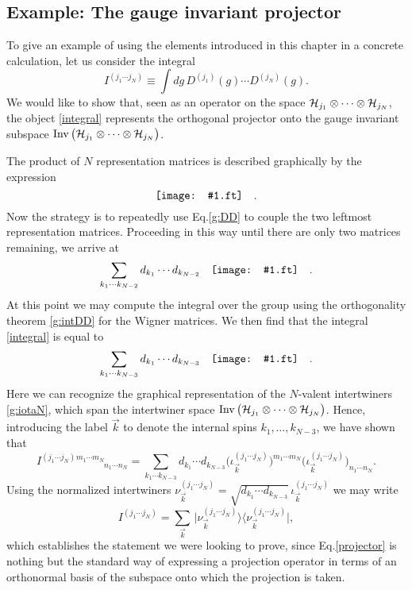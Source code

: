 \documentclass[graybox, secnum]{svmult}
\makeatletter
\newcommand{\ft}{pdf}        %
\newcommand{\makeSymbol}[1]{\mathord{\vcenter{\hbox{#1}}}}
\newcommand{\Symbol}[1]{\makeSymbol{\texttt{[image: \#1.\\ft]}}}
\newcommand{\bbra}[1]{\bigl\langle #1 \bigr|}
\newcommand{\bket}[1]{\bigl|#1\bigr\rangle}
\newcommand{\Eq}[1]{Eq.\@\xspace\eqref{#1}}
\newcommand{\updown}[2]{^{#1}_{\phantom{#1}#2}}
\makeatother
\begin{document}
\subsection{Example: The gauge invariant projector}

To give an example of using the elements introduced in this chapter in a concrete calculation, let us consider the integral
\begin{equation}
	I^{(j_1\cdots j_N)} \equiv \int dg\,D^{(j_1)}(g)\cdots D^{(j_N)}(g).
	\label{integral}
\end{equation}
We would like to show that, seen as an operator on the space ${\cal H}_{j_1} \otimes \cdots \otimes {\cal H}_{j_N}$, the object \eqref{integral} represents the orthogonal projector onto the gauge invariant subspace ${\rm Inv}\,\bigl({\cal H}_{j_1} \otimes \cdots \otimes {\cal H}_{j_N}\bigr)$.

The product of $N$ representation matrices is described graphically by the expression
\begin{equation}
	\Symbol{D_product} \quad . 
	\label{}
\end{equation}
Now the strategy is to repeatedly use \Eq{g:DD} to couple the two leftmost representation matrices. Proceeding in this way until there are only two matrices remaining, we arrive at
\begin{equation}
	\sum_{k_1\cdots k_{N-2}} d_{k_1}\cdots d_{k_{N-2}}\quad\Symbol{all_coupled} \quad . 
	\label{}
\end{equation}
At this point we may compute the integral over the group using the orthogonality theorem \eqref{g:intDD} for the Wigner matrices. We then find that the integral \eqref{integral} is equal to
\begin{equation}
	\sum_{k_1\cdots k_{N-3}} d_{k_1}\cdots d_{k_{N-3}}\quad \Symbol{projector} \quad . 
	\label{}
\end{equation}
Here we can recognize the graphical representation of the $N$-valent intertwiners \eqref{g:iotaN}, which span the intertwiner space ${\rm Inv}\,\bigl({\cal H}_{j_1} \otimes \cdots \otimes {\cal H}_{j_N}\bigr)$. Hence, introducing the label $\vec k$ to denote the internal spins $k_1, \dots, k_{N-3}$, we have shown that
\begin{equation}
	I^{(j_1\cdots j_N)}{}\updown{m_1\cdots m_N}{n_1\cdots n_N} = \sum_{k_1\cdots k_{N-3}} d_{k_1}\cdots d_{k_{N-3}}\bigl(\iota^{(j_1\cdots j_N)}_{\vec k}\bigr)^{m_1\cdots m_N}\bigl(\iota^{(j_1\cdots j_N)}_{\vec k}\bigr)_{n_1\cdots n_N}.
	\label{}
\end{equation}
Using the normalized intertwiners $\nu^{(j_1\cdots j_N)}_{\vec k} = \sqrt{d_{k_1}\cdots d_{k_{N-3}}}\,\iota^{(j_1\cdots j_N)}_{\vec k}$ we may write
\begin{equation}
	I^{(j_1\cdots j_N)} = \sum_{\vec k}\,\bket{\nu^{(j_1\cdots j_N)}_{\vec k}}\bbra{\nu^{(j_1\cdots j_N)}_{\vec k}}, 
	\label{projector}
\end{equation}
which establishes the statement we were looking to prove, since \Eq{projector} is nothing but the standard way of expressing a projection operator in terms of an orthonormal basis of the subspace onto which the projection is taken.
\end{document}
